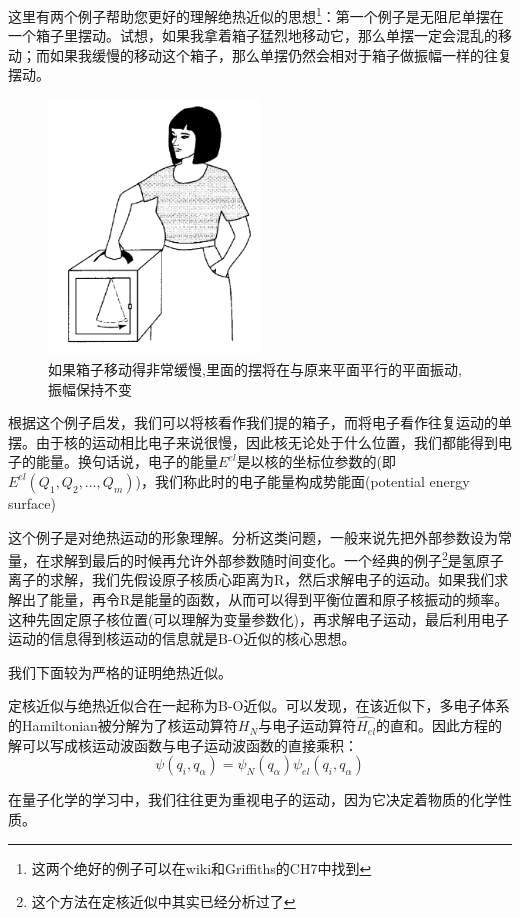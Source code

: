         \begin{remark}
        这里有两个例子帮助您更好的理解绝热近似的思想\footnote{这两个绝好的例子可以在wiki和Griffiths的CH7中找到}：第一个例子是无阻尼单摆在一个箱子里摆动。试想，如果我拿着箱子猛烈地移动它，那么单摆一定会混乱的移动；而如果我缓慢的移动这个箱子，那么单摆仍然会相对于箱子做振幅一样的往复摆动。
        \begin{figure}[H]
            \centering
            \includegraphics[width=0.5\textwidth]{figure/adiabaticprocess.png}
            \caption{如果箱子移动得非常缓慢,里面的摆将在与原来平面平行的平面振动,振幅保持不变}
            \label{fig:adiabaticprocess}
        \end{figure}
        
        根据这个例子启发，我们可以将核看作我们提的箱子，而将电子看作往复运动的单摆。由于核的运动相比电子来说很慢，因此核无论处于什么位置，我们都能得到电子的能量。换句话说，电子的能量$E^{el}$是以核的坐标位参数的(即$E^{el}(Q_1,Q_2,\dots,Q_m)$)，我们称此时的电子能量构成势能面(potential energy surface)
        
        这个例子是对绝热运动的形象理解。分析这类问题，一般来说先把外部参数设为常量，在求解到最后的时候再允许外部参数随时间变化。一个经典的例子\footnote{这个方法在定核近似中其实已经分析过了}是氢原子离子的求解，我们先假设原子核质心距离为R，然后求解电子的运动。如果我们求解出了能量，再令R是能量的函数，从而可以得到平衡位置和原子核振动的频率。这种先固定原子核位置(可以理解为变量参数化)，再求解电子运动，最后利用电子运动的信息得到核运动的信息就是B-O近似的核心思想。
        \end{remark}
        
        我们下面较为严格的证明绝热近似。
        
        
        定核近似与绝热近似合在一起称为B-O近似。可以发现，在该近似下，多电子体系的Hamiltonian被分解为了核运动算符$\hat{H_N}$与电子运动算符$\hat{H_{el}}$的直和。因此方程的解可以写成核运动波函数与电子运动波函数的直接乘积：
        \begin{equation}
            \psi(q_i,q_\alpha)=\psi_N(q_\alpha)\psi_{el}(q_i,q_\alpha)
        \end{equation}
        
        在量子化学的学习中，我们往往更为重视电子的运动，因为它决定着物质的化学性质。